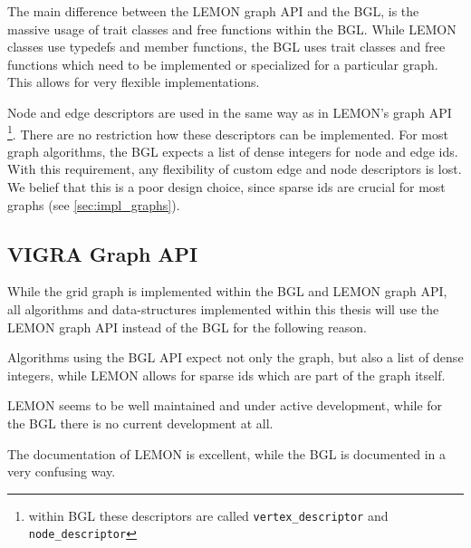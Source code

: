 The main difference between the LEMON graph API and the BGL,
is the massive usage of trait classes and free functions within the BGL.
While LEMON classes use typedefs and member functions, 
the BGL uses trait classes and free functions which need 
to be implemented or specialized for a particular graph.
This allows for very flexible implementations.

Node and edge descriptors are used in the same way as in LEMON's
graph API \footnote{within BGL these descriptors are called \lstinline{vertex_descriptor} and 
\lstinline{node_descriptor}}.
There are no restriction how these descriptors can be implemented.
For most graph algorithms, the BGL expects a list of dense integers for
node and edge ids.
With this requirement, any flexibility of custom edge and node descriptors is lost.
We belief that this is a poor design choice, since sparse ids
are crucial for most graphs (see \cref{sec:impl_graphs}).




\subsection{VIGRA Graph API}

While the grid graph is implemented within the BGL and LEMON graph API,
all algorithms and data-structures implemented within this thesis will
use the LEMON graph API instead of the BGL 
for the following reason.
\begin{inparaenum}[(i)]
\item Algorithms using the BGL API expect not only the graph, but also 
a list of dense integers, while LEMON allows for sparse ids which 
are part of the graph itself.
\item LEMON seems to be well maintained and under active development,
while for the BGL there is no current development at all.
\item The documentation of LEMON is excellent, while the BGL is
documented in a very confusing way.
  
\end{inparaenum}

